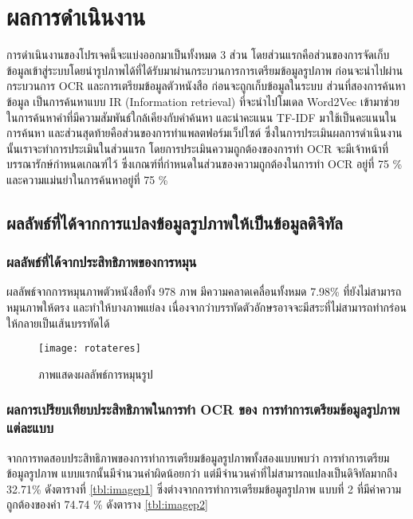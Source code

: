 \chapter{ผลการดำเนินงาน}

การดำเนินงานของโปรเจคนี้จะแบ่งออกมาเป็นทั้งหมด 3 ส่วน โดยส่วนแรกคือส่วนของการจัดเก็บข้อมูลเข้าสู่ระบบโดยนำรูปภาพได้ที่ได้รับมาผ่านกระบวนการการเตรียมข้อมูลรูปภาพ 
ก่อนจะนำไปผ่านกระบวนการ OCR และการเตรียมข้อมูลตัวหนังสือ ก่อนจะถูกเก็บข้อมูลในระบบ ส่วนที่สองการค้นหาข้อมูล เป็นการค้นหาแบบ IR (Information retrieval) 
ที่จะนำไปโมเดล Word2Vec เข้ามาช่วยในการค้นหาคำที่มีความสัมพันธ์ใกล้เคียงกับคำค้นหา และนำคะแนน TF-IDF มาใช้เป็นคะแนนในการค้นหา และส่วนสุดท้ายคือส่วนของการทำแพลตฟอร์มเว็ปไซต์
ซึ่งในการประเมินผลการดำเนินงานนั้นเราจะทำการประเมินในส่วนแรก โดยการประเมินความถูกต้องของการทำ OCR จะมีเจ้าหน้าที่บรรณารักษ์กำหนดเกณฑ์ไว้ 
ซึ่งเกณฑ์ที่กำหนดในส่วนของความถูกต้องในการทำ OCR อยู่ที่ 75 \% และความแม่นยำในการค้นหาอยู่ที่ 75 \%

\section{ผลลัพธ์ที่ได้จากการแปลงข้อมูลรูปภาพให้เป็นข้อมูลดิจิทัล}

\subsection{ผลลัพธ์ที่ได้จากประสิทธิภาพของการหมุน}
ผลลัพธ์จากการหมุนภาพตัวหนังสือทั้ง 978 ภาพ มีความคลาดเคลื่อนทั้งหมด 7.98\% ที่ยังไม่สามารถหมุนภาพให้ตรง และทำให้บางภาพแย่ลง เนื่องจากว่าบรรทัดตัวอักษรอาจจะมีสระที่ไม่สามารถทำกร่อนให้กลายเป็นเส้นบรรทัดได้

\begin{figure}[H]
    \centering
    \texttt{[image: rotateres]}
    \caption{ภาพแสดงผลลัพธ์การหมุนรูป}\label{fig:rotateres}
\end{figure}

\subsection{ผลการเปรียบเทียบประสิทธิภาพในการทำ OCR ของ การทำการเตรียมข้อมูลรูปภาพ แต่ละแบบ}

จากการทดสอบประสิทธิภาพของการทำการเตรียมข้อมูลรูปภาพทั้งสองแบบพบว่า การทำการเตรียมข้อมูลรูปภาพ แบบแรกนั้นมีจำนวนคำผิดน้อยกว่า แต่มีจำนวนคำที่ไม่สามารถแปลงเป็นดิจิทัลมากถึง 32.71\% ดังตารางที่ \ref{tbl:imagep1} ซึ่งต่างจากการทำการเตรียมข้อมูลรูปภาพ แบบที่ 2 ที่มีค่าความถูกต้องของคำ 74.74 \% ดังตาราง \ref{tbl:imagep2}

